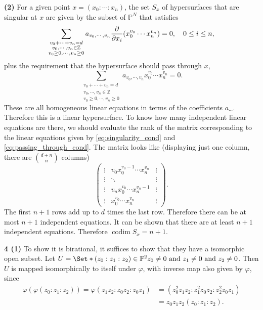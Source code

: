 \documentclass{article}
\makeatletter
\newcommand*{\shifttext}[1]{%
  \settowidth{\@tempdima}{#1}%
  \hspace{-\@tempdima}#1%
}
\newcommand{\plabel}[1]{%
\shifttext{\textbf{#1}\quad}%
}
\newcommand{\prule}{%
\begin{center}%
\hdashrule[0.5ex]{.99\linewidth}{1pt}{1pt 2.5pt}%
\end{center}%
}
\makeatother
\begin{document}
\plabel{(2)}%
For a given point $x = (x_0:\cdots:x_n)$, the set $S_x$ of hypersurfaces that are singular at $x$ are given by the subset of $\mathbb{P}^N$ that satisfies
\begin{equation}
    \label{eq:singularity_cond}
    \sum_{\substack{v_0+\cdots+v_n = d \\ v_0,\cdots,v_n\in\mathbb{Z}\\ v_0\ge 0,\cdots,v_n\ge 0}} a_{v_0,\cdots,v_n} \pdv{x_i} \qty(x_0^{v_0} \cdots x_n^{v_n}) = 0,\quad 0\le i\le n,
\end{equation}
plus the requirement that the hypersurface should pass through $x$,
\begin{equation}
    \label{eq:passing_through_cond}
    \sum_{\substack{v_0+\cdots+v_n = d \\ v_0,\cdots,v_n\in\mathbb{Z}\\ v_0\ge 0,\cdots,v_n\ge 0}} a_{v_0,\cdots,v_n} x_0^{v_0} \cdots x_n^{v_n} = 0.
\end{equation}
These are all homogeneous linear equations in terms of the coefficients $a_{\cdots}$.
Therefore this is a linear hypersurface.
To know how many independent linear equations are there, we should evaluate the rank of the matrix corresponding to the linear equations given by \eqref{eq:singularity_cond} and \eqref{eq:passing_through_cond}.
The matrix looks like (displaying just one column, there are $\binom{d+n}{n}$ columns)
\[ \begin{pmatrix}
    \vdots & v_0 x_0^{v_0-1}\cdots x_n^{v_n} & \vdots \\
    \vdots & \ddots & \vdots \\
    \vdots & v_n x_0^{v_0}\cdots x_n^{v_n-1} & \vdots \\
    \vdots & x_0^{v_0}\cdots x_n^{v_n} & \vdots
\end{pmatrix}. \]
The first $n+1$ rows add up to $d$ times the last row.
Therefore there can be at most $n+1$ independent equations.
It can be shown that there are at least $n+1$ independent equations.
Therefore $\operatorname{codim} S_x = n+1$.

\prule

\plabel{4 (1)}%
To show it is birational, it suffices to show that they have a isomorphic open subset.
Let $U = \Set*{(z_0:z_1:z_2) \in \mathbb{P}^2}{z_0 \neq 0 \text{ and } z_1 \neq 0 \text{ and } z_2 \neq 0}$.
Then $U$ is mapped isomorphically to itself under $\varphi$, with inverse map also given by $\varphi$, since
\begin{align*}
    \varphi(\varphi(z_0:z_1:z_2)) = \varphi(z_1z_2:z_0z_2:z_0z_1) &= (z_0^2z_1z_2:z_1^2z_0z_2:z_2^2z_0z_1) \\
    &= z_0z_1z_2 (z_0:z_1:z_2).
\end{align*}
\end{document}
